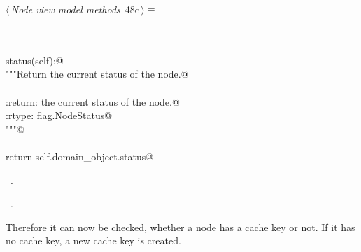 \documentclass[
    a4paper,      %
    10pt,         %
    openright,    %
    notitlepage,  %
    parskip=half, %
]{scrreprt}       %
\theoremstyle{definition}                    %
\begin{document}
\begin{flushleft} \small
\begin{minipage}{\linewidth}\label{scrap68}\raggedright\small
{} $\langle\,${\itshape Node view model methods}\nobreak\ {\footnotesize {48c}}$\,\rangle\equiv$
\vspace{-1ex}
\begin{list}{}{} \item
\mbox{}\lstinline@@\\
\mbox{}\lstinline@property@\\
\mbox{}\lstinline@def status(self):@\\
\mbox{}\lstinline@    """Return the current status of the node.@\\
\mbox{}\lstinline@@\\
\mbox{}\lstinline@    :return: the current status of the node.@\\
\mbox{}\lstinline@    :rtype: flag.NodeStatus@\\
\mbox{}\lstinline@    """@\\
\mbox{}\lstinline@@\\
\mbox{}\lstinline@    return self.domain_object.status@\\
\mbox{}\lstinline@@{\NWsep}
\end{list}
\vspace{-1.5ex}
\footnotesize
\begin{list}{}{\setlength{\itemsep}{-\parsep}\setlength{\itemindent}{-\leftmargin}}
\item \NWtxtMacroDefBy\ .
\item \NWtxtMacroRefIn\ .

\item{}
\end{list}
\end{minipage}\vspace{4ex}
\end{flushleft}
Therefore it can now be checked, whether a node has a cache key or not. If it
has no cache key, a new cache key is created.
\end{document}
